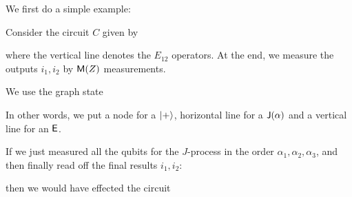 We first do a simple example:
\begin{eg}
  Consider the circuit $C$ given by
  \begin{center}
  \end{center}
  where the vertical line denotes the $E_{12}$ operators. At the end, we measure the outputs $i_1, i_2$ by $\mathsf{M}(Z)$ measurements.

  We use the graph state
  \begin{center}
  \end{center}
  In other words, we put a node for a $\left\lvert +\right\rangle$, horizontal line for a $\mathsf{J}(\alpha)$ and a vertical line for an $\mathsf{E}$.

  If we just measured all the qubits for the $J$-process in the order $\alpha_1, \alpha_2, \alpha_3$, and then finally read off the final results $i_1, i_2$:
  \begin{center}
  \end{center}
  then we would have effected the circuit
  \begin{center}
  \end{center}
\end{eg}
